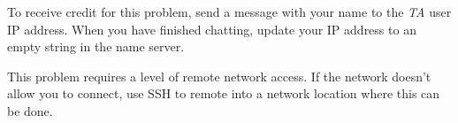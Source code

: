 \begin{problem}
To receive credit for this problem, send a message with your name to the \emph{TA} user IP address.
When you have finished chatting, update your IP address to an empty string in the name server.

\begin{warn}
This problem requires a level of remote network access. If the network doesn't allow you to connect, use SSH to remote into a network location where this can be done.
\end{warn}
\end{problem}
